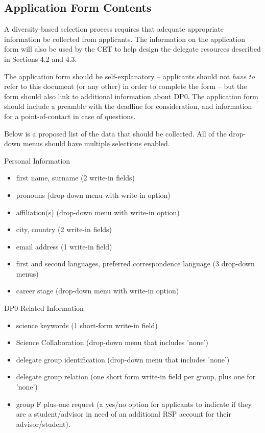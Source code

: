 \documentclass[DM,lsstdraft,authoryear,toc]{lsstdoc}
\begin{document}
\subsection{Application Form Contents}\label{ssec:sel_form}

A diversity-based selection process requires that adequate appropriate information be collected from applicants.
The information on the application form will also be used by the CET to help design the delegate resources described in Sections 4.2 and 4.3. 

The application form should be self-explanatory -- applicants should not \emph{have to} refer to this document (or any other) in order to complete the form -- but the form should also link to additional information about DP0.
The application form should include a preamble with the deadline for consideration, and information for a point-of-contact in case of questions.

Below is a proposed list of the data that should be collected.
All of the drop-down menus should have multiple selections enabled.

Personal Information
\begin{itemize}
\item first name, surname (2 write-in fields)
\item pronouns (drop-down menu with write-in option)
\item affiliation(s) (drop-down menu with write-in option)
\item city, country (2 write-in fields)
\item email address (1 write-in field)
\item first and second languages, preferred correspondence language (3 drop-down menus)
\item career stage (drop-down menu with write-in option)
\end{itemize}

DP0-Related Information
\begin{itemize}
\item science keywords (1 short-form write-in field)
\item Science Collaboration (drop-down menu that includes 'none')
\item delegate group identification (drop-down menu that includes 'none')
\item delegate group relation (one short form write-in field per group, plus one for 'none')
\item group F plus-one request (a yes/no option for applicants to indicate if they are a student/advisor in need of an additional RSP account for their advisor/student).
\end{itemize}
\end{document}
